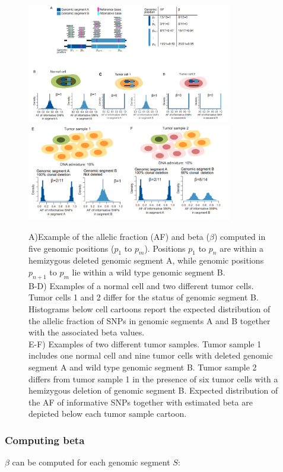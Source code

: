 	\begin{figure}[H]
		\centering
		\includegraphics[width=0.8\textwidth]{a.png}
		\includegraphics[width=0.8\textwidth]{b.png}
		\caption{A)Example of the allelic fraction (AF) and beta ($\beta$) computed in five genomic positions ($p_1$ to $p_m$).
			Positions $p_1$ to $p_n$ are within a hemizygous deleted genomic segment A, while genomic positions $p_{n+1}$ to $p_m$ lie within a wild type genomic segment B.\\
			B-D) Examples of a normal cell and two different tumor cells.
			Tumor cells 1 and 2 differ for the status of genomic segment B.
			Histograms below cell cartoons report the expected distribution of the allelic fraction of SNPs in genomic segments A and B together with the associated beta values.\\
			E-F) Examples of two different tumor samples.
			Tumor sample 1 includes one normal cell and nine tumor cells with deleted genomic segment A and wild type genomic segment B.
			Tumor sample 2 differs from tumor sample 1 in the presence of six tumor cells with a hemizygous deletion of genomic segment B.
			Expected distribution of the AF of informative SNPs together with estimated beta are depicted below each tumor sample cartoon.}
		\label{fig:b_af_purity}
	\end{figure}

		\subsubsection{Computing beta}
		$\beta$ can be computed for each genomic segment $S$:

